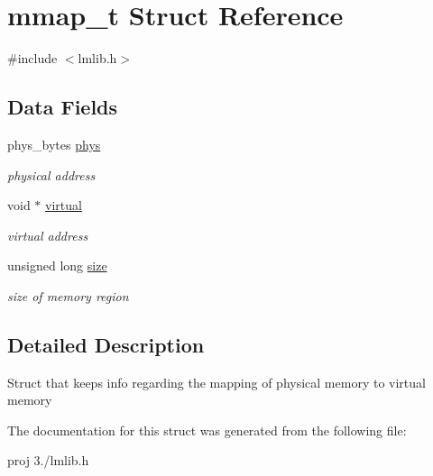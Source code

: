 \hypertarget{structmmap__t}{}\section{mmap\+\_\+t Struct Reference}
\label{structmmap__t}


{\ttfamily \#include $<$lmlib.\+h$>$}

\subsection*{Data Fields}
\begin{DoxyCompactItemize}
\item 
\hypertarget{group__lmlib_gab7a85fe0db943529016cf606e3a7167f}{}phys\+\_\+bytes \hyperlink{group__lmlib_gab7a85fe0db943529016cf606e3a7167f}{phys}\label{group__lmlib_gab7a85fe0db943529016cf606e3a7167f}

\begin{DoxyCompactList}\small\item\em physical address \end{DoxyCompactList}\item 
\hypertarget{group__lmlib_ga6a0ea2231d30f2b025e0c4b9f12dd6db}{}void $\ast$ \hyperlink{group__lmlib_ga6a0ea2231d30f2b025e0c4b9f12dd6db}{virtual}\label{group__lmlib_ga6a0ea2231d30f2b025e0c4b9f12dd6db}

\begin{DoxyCompactList}\small\item\em virtual address \end{DoxyCompactList}\item 
\hypertarget{group__lmlib_ga1e1268d164c38e4f8a4f4eb9058b0601}{}unsigned long \hyperlink{group__lmlib_ga1e1268d164c38e4f8a4f4eb9058b0601}{size}\label{group__lmlib_ga1e1268d164c38e4f8a4f4eb9058b0601}

\begin{DoxyCompactList}\small\item\em size of memory region \end{DoxyCompactList}\end{DoxyCompactItemize}


\subsection{Detailed Description}
Struct that keeps info regarding the mapping of physical memory to virtual memory 

The documentation for this struct was generated from the following file\+:\begin{DoxyCompactItemize}
\item 
proj 3./lmlib.\+h\end{DoxyCompactItemize}
